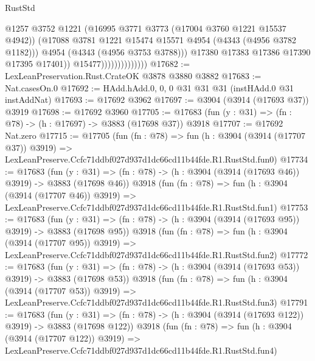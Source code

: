 \begin{lexlean}{RustStd}
\begin{coremodule}
                                      @1257
                                      @3752
                                      @1221
                                      (@16995 @3771 @3773 (@17004 @3760 @1221 @15537 @4942))
                                      (@17088
                                        @3781
                                        @1221
                                        @15474
                                        @15571
                                        @4954
                                        (@4343 (@4956 @3782 @1182)))
                                      @4954
                                      (@4343 (@4956 @3753 @3788)))
                                    @17380
                                    @17383
                                    @17386
                                    @17390
                                    @17395
                                    @17401))
                                @15477))))))))))))))
@17682 := LexLeanPreservation.Rust.CrateOK @3878 @3880 @3882
@17683 := Nat.casesOn.{0}
@17692 := HAdd.hAdd.{0, 0, 0} @31 @31 @31 (instHAdd.{0} @31 instAddNat)
@17693 := @17692 @3962
@17697 := @3904 (@3914 (@17693 @37)) @3919
@17698 := @17692 @3960
@17705 := @17683 (fun (y : @31) => (fn : @78) -> (h : @17697) -> @3883 (@17698 @37)) @3918
@17707 := @17692 Nat.zero
@17715 := @17705
    (fun (fn : @78) =>
    fun (h : @3904 (@3914 (@17707 @37)) @3919) =>
    LexLeanPreserve.Ccfc71ddbf027d937d1dc66cd11b44fde.R1.RustStd.fun0)
@17734 := @17683
    (fun (y : @31) => (fn : @78) -> (h : @3904 (@3914 (@17693 @46)) @3919) -> @3883 (@17698 @46))
    @3918
    (fun (fn : @78) =>
    fun (h : @3904 (@3914 (@17707 @46)) @3919) =>
    LexLeanPreserve.Ccfc71ddbf027d937d1dc66cd11b44fde.R1.RustStd.fun1)
@17753 := @17683
    (fun (y : @31) => (fn : @78) -> (h : @3904 (@3914 (@17693 @95)) @3919) -> @3883 (@17698 @95))
    @3918
    (fun (fn : @78) =>
    fun (h : @3904 (@3914 (@17707 @95)) @3919) =>
    LexLeanPreserve.Ccfc71ddbf027d937d1dc66cd11b44fde.R1.RustStd.fun2)
@17772 := @17683
    (fun (y : @31) => (fn : @78) -> (h : @3904 (@3914 (@17693 @53)) @3919) -> @3883 (@17698 @53))
    @3918
    (fun (fn : @78) =>
    fun (h : @3904 (@3914 (@17707 @53)) @3919) =>
    LexLeanPreserve.Ccfc71ddbf027d937d1dc66cd11b44fde.R1.RustStd.fun3)
@17791 := @17683
    (fun (y : @31) => (fn : @78) -> (h : @3904 (@3914 (@17693 @122)) @3919) -> @3883 (@17698 @122))
    @3918
    (fun (fn : @78) =>
    fun (h : @3904 (@3914 (@17707 @122)) @3919) =>
    LexLeanPreserve.Ccfc71ddbf027d937d1dc66cd11b44fde.R1.RustStd.fun4)

\end{coremodule}
\end{lexlean}
